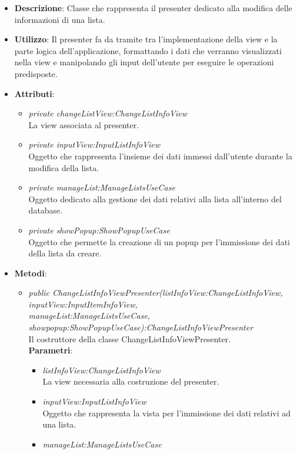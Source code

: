 \begin{itemize}
\item \textbf{Descrizione}: Classe che rappresenta il presenter dedicato alla modifica delle informazioni di una lista.
\item \textbf{Utilizzo}: Il presenter fa da tramite tra l'implementazione della view e la parte logica dell'applicazione, formattando i dati che verranno visualizzati nella view e manipolando gli input dell'utente per eseguire le operazioni predisposte.
\item \textbf{Attributi}:
	\begin{itemize}
	\item \textit{private changeListView:ChangeListInfoView}\\
		La view associata al presenter.
	\item \textit{private inputView:InputListInfoView}\\
		Oggetto che rappresenta l'insieme dei dati immessi dall'utente durante la modifica della lista.
	\item \textit{private manageList:ManageListsUseCase}\\
Oggetto dedicato alla gestione dei dati relativi alla lista all'interno del database.
	\item \textit{private showPopup:ShowPopupUseCase}\\
		Oggetto che permette la creazione di un popup per l'immissione dei dati della lista da creare.	
	\end{itemize} 
\item \textbf{Metodi}:
	\begin{itemize}
	\item \textit{public ChangeListInfoViewPresenter(listInfoView:ChangeListInfoView, inputView:InputItemInfoView, \\ manageList:ManageListsUseCase, showpopup:ShowPopupUseCase):ChangeListInfoViewPresenter}\\
Il costruttore della classe ChangeListInfoViewPresenter.
			\\ \textbf{Parametri}: \begin{itemize}
			\item \textit{listInfoView:ChangeListInfoView}\\
			La view necessaria alla costruzione del presenter.
			\item \textit{inputView:InputListInfoView}\\
			Oggetto che rappresenta la vista per l'immissione dei dati relativi ad una lista.
			\item \textit{manageList:ManageListsUseCase}\\

\end{itemize}
\end{itemize}
\end{itemize}
